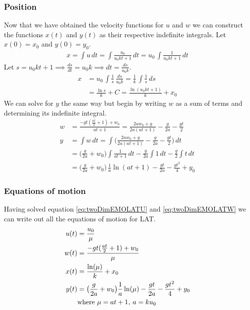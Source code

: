 \documentclass[%
aip,
jmp,
amsmath,amssymb,
reprint,%
]{revtex4-1}
\newcommand{\comma}{\hspace{0.1mm},\hspace{0.7mm}}
\begin{document}
	\subsubsection{Position}
	Now that we have obtained the velocity functions for $u$ and $w$ we can construct the functions $x(t)$ and $y(t)$ as their respective indefinite integrals. Let $x(0) = x_0$ and $y(0) = y_0$.
	\begin{align}\nonumber
		x = \int u\,dt = \int \frac{u_0}{u_0kt+1}\,dt = u_0\,\int\frac{1}{u_0kt+1}\,dt
	\end{align}
	Let $s = u_0kt+1 \implies \frac{ds}{dt} = u_0k \implies dt = \frac{ds}{u_0k}$.
	\begin{align}\nonumber
		x &= u_0\,\int\frac{1}{s}\,\frac{ds}{u_0k} = \frac{1}{k}\,\int\frac{1}{s}\,ds\\\nonumber
		&= \frac{\ln s}{k} + C = \frac{\ln(u_0kt+1)}{k} + x_0
	\end{align}
	We can solve for $y$ the same way but begin by writing $w$ as a sum of terms and determining its indefinite integral.
	\begin{align}\nonumber
		w &= \frac{-gt(\frac{at}{2}+1)+w_0}{at+1} = \frac{2aw_0+g}{2a(at+1)}-\frac{g}{2a}-\frac{gt}{2}\\\nonumber
		y &= \int w\,dt = \int \Big(\frac{2aw_0+g}{2a(at+1)}-\frac{g}{2a}-\frac{gt}{2}\Big)\,dt \\\nonumber
		&=\big(\frac{g}{2a}+w_0\big)\int\frac{1}{at+1}\,dt -\frac{g}{2a}\int 1\,dt -\frac{g}{2}\int t\,dt\\\nonumber
		&=\big(\frac{g}{2a}+w_0\big)\,\frac{1}{a}\ln(at+1) -\frac{gt}{2a}-\frac{gt^2}{4}+y_0
	\end{align}
	\subsubsection{Equations of motion}
	Having solved equation \eqref{eq:twoDimEMOLATU} and \eqref{eq:twoDimEMOLATW} we can write out all the equations of motion for LAT.
	\begin{align*}\nonumber
		u(t) &= \frac{u_0}{\mu}\\\nonumber
		w(t) &= \frac{-gt(\frac{at}{2}+1)+w_0}{\mu}\\\nonumber
		x(t) &= \frac{\ln(\mu)}{k} + x_0\\\nonumber
		y(t) &= \big(\frac{g}{2a}+w_0\big)\frac{1}{a}\ln(\mu) -\frac{gt}{2a}-\frac{gt^2}{4}+y_0\\\nonumber
		&\mathrm{where}\,\,\mu = at+1 \comma a = ku_0
	\end{align*}
\end{document}
